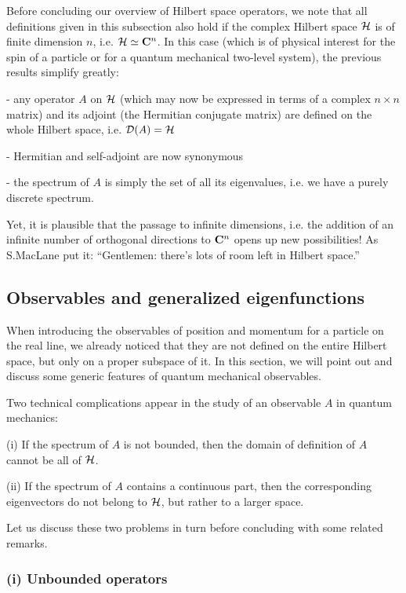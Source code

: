 \documentclass[a4wide,12pt]{report}
\begin{document}
Before concluding our overview of Hilbert space operators, 
we note that all definitions
given in this subsection 
also hold if the complex Hilbert space ${\cal H}$
is of finite dimension $n$, i.e. ${\cal H} \simeq {\bf C}^n$.
In this case (which is of physical interest for  
the spin of a particle or for a quantum mechanical two-level system),  
the previous results simplify greatly: 

- any operator $A$ on ${\cal H}$  
(which may now be expressed in terms of a complex $n\times n$ matrix)
and its adjoint (the Hermitian conjugate matrix) 
are  defined on the whole Hilbert space, 
i.e. ${\cal D}(A) = {\cal H}$

- Hermitian and self-adjoint are now synonymous

- the spectrum 
of $A$ is simply the set of all its eigenvalues, i.e. we have  
 a purely discrete spectrum.    

Yet, it is plausible that the passage to infinite dimensions, i.e. 
the addition of 
an infinite number of orthogonal directions 
to ${\bf C}^n$ 
opens up new possibilities!
As S.MacLane put it: ``Gentlemen: there's lots of room 
left in Hilbert space.'' \cite{rs}

\subsection{Observables and generalized eigenfunctions}

When introducing the observables of position and momentum
for a particle on the real line, we already noticed that they 
are not defined on the entire Hilbert space, but 
only on a proper subspace of it. 
In this section, we will point out and discuss 
some generic features
of quantum mechanical observables. 


Two technical complications appear in the study 
of an observable $A$
in quantum mechanics:
 
\noindent (i) If the spectrum of $A$ is not bounded, then 
the domain of definition of $A$ cannot be all of ${\cal H}$.
 
\noindent (ii) If the spectrum of $A$ contains a continuous part,  
then the corresponding eigenvectors 
do not belong to ${\cal H}$, but rather to a larger space.  
 
Let us discuss 
these two problems in turn before concluding with some related remarks.  

\subsubsection{(i) Unbounded operators}
\end{document}

